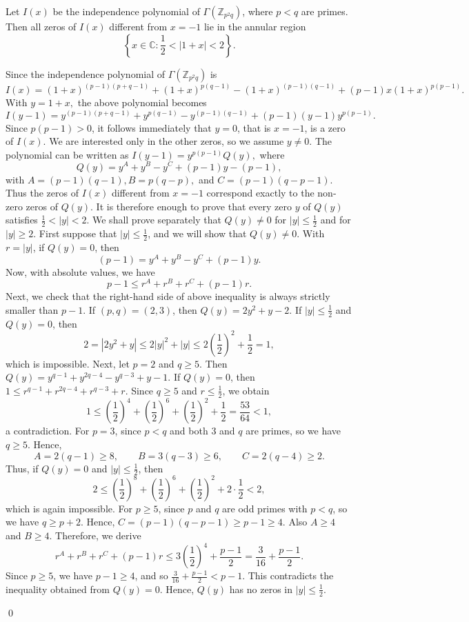 \documentclass[10pt,a4paper]{amsart}
\renewenvironment{proof}{{\noindent\bfseries Proof.}}{\qed}
\begin{document}
\begin{theorem}
	Let $I(x)$ be the independence polynomial of $\varGamma(\mathbb{Z}_{p^{2}q})$, where $p<q$ are primes. Then  all zeros of $I(x)$ different from $x=-1$ lie in the annular region
	$$
	\left\{x\in\mathbb{C}:\frac{1}{2}<|1+x|<2\right\}.
	$$
\end{theorem}

\begin{proof}
	Since the independence polynomial of $\varGamma(\mathbb{Z}_{p^{2}q})$ is
	$$
	I(x)
	=
	(1+x)^{(p-1)(p+q-1)}
	+
	(1+x)^{p(q-1)}
	-
	(1+x)^{(p-1)(q-1)}
	+
	(p-1)x(1+x)^{p(p-1)}.
	$$
	With 
	$
	y=1+x,
	$ the above polynomial becomes
	$$
	I(y-1)
	=
	y^{(p-1)(p+q-1)}
	+
	y^{p(q-1)}
	-
	y^{(p-1)(q-1)}
	+
	(p-1)(y-1)y^{p(p-1)}.
	$$
	Since $p(p-1)>0$, it follows immediately that $y=0$, that is $x=-1$, is a zero of $I(x)$. We are interested only in the other zeros, so we assume $y\neq 0$.  The polynomial can be written as $
	I(y-1)
	=
	y^{p(p-1)}Q(y),
	$
	where
	$$
	Q(y)
	=
	y^{A}+y^{B}-y^{C}+(p-1)y-(p-1),
	$$
	with
	$
	A=(p-1)(q-1),
	B=p(q-p),$ and $
	C=(p-1)(q-p-1).
	$
	Thus the zeros of $I(x)$ different from $x=-1$ correspond exactly to the non-zero zeros of $Q(y)$. It is therefore enough to prove that every zero $y$ of $Q(y)$ satisfies
	$
	\tfrac{1}{2}<|y|<2.
	$
	We shall prove separately that $Q(y)\neq 0$ for $|y|\leq \tfrac12$ and for $|y|\geq 2$.
	 First suppose that $|y|\leq \tfrac12$, and we will show that $Q(y)\neq 0$. With $r=|y|$, if $Q(y)=0$, then
	$$
	(p-1)
	=
	y^{A}+y^{B}-y^{C}+(p-1)y.
	$$
	Now, with absolute values, we have
	$$
	p-1
	\leq
	r^{A}+r^{B}+r^{C}+(p-1)r.
	$$
	Next, we check that the right-hand side of above inequality is always strictly smaller than $p-1$.
	 If $(p,q)=(2,3)$, then
	$
	Q(y)=2y^{2}+y-2.
	$
	If $|y|\leq \tfrac12$ and $Q(y)=0$, then
	$$
	2=|2y^{2}+y|\leq 2|y|^{2}+|y|\leq 2\left(\frac12\right)^2+\frac12=1,
	$$
	which is impossible. Next, let $p=2$ and $q\geq 5$. Then
	$
	Q(y)=y^{q-1}+y^{2q-4}-y^{q-3}+y-1.
	$
	If $Q(y)=0$, then
	$
	1
	\leq
	r^{q-1}+r^{2q-4}+r^{q-3}+r.
	$
	Since $q\geq 5$ and $r\leq \frac12$, we obtain
	$$
	1
	\leq
	\left(\frac12\right)^4
	+
	\left(\frac12\right)^6
	+
	\left(\frac12\right)^2
	+
	\frac12
	=
	\frac{53}{64}<1,
	$$
	a contradiction. For $p=3$, since $p<q$ and both $3$ and $q$ are primes, so we have $q\geq 5$. Hence,
	$$
	A=2(q-1)\geq 8,\qquad
	B=3(q-3)\geq 6,\qquad
	C=2(q-4)\geq 2.
	$$
	Thus, if $Q(y)=0$ and $|y|\leq \frac12$, then
	$$
	2
	\leq
	\left(\frac12\right)^8
	+
	\left(\frac12\right)^6
	+
	\left(\frac12\right)^2
	+
	2\cdot\frac12
	<2,
	$$
	which is again impossible. For $p\geq 5$, since $p$ and $q$ are odd primes with $p<q$, so we have $q\geq p+2$. Hence, 
	$
	C=(p-1)(q-p-1)\geq p-1\geq 4.
	$
	Also $A\geq 4$ and $B\geq 4$. Therefore, we derive
	$$
	r^{A}+r^{B}+r^{C}+(p-1)r
	\leq
	3\left(\frac12\right)^4+\frac{p-1}{2}
	=
	\frac{3}{16}+\frac{p-1}{2}.
	$$
	Since $p\geq 5$, we have $p-1\geq 4$, and so
	$
	\frac{3}{16}+\frac{p-1}{2}<p-1.
	$
	This contradicts the inequality obtained from $Q(y)=0$. Hence, $Q(y)$ has no zeros in $|y|\leq \frac12$.
	

\end{proof}
\end{document}
